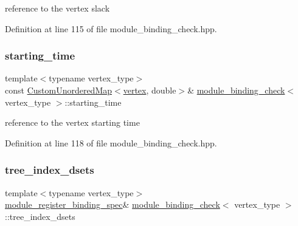 reference to the vertex slack 



Definition at line 115 of file module\+\_\+binding\+\_\+check.\+hpp.

\mbox{\label{structmodule__binding__check_a1d5792322e2f29615ff44bd2989812bc}} 
\subsubsection{\texorpdfstring{starting\+\_\+time}{starting\_time}}
{\footnotesize\ttfamily template$<$typename vertex\+\_\+type$>$ \\
const \hyperlink{custom__map_8hpp_ad1ed68f2ff093683ab1a33522b144adc}{Custom\+Unordered\+Map}$<$\hyperlink{graph_8hpp_abefdcf0544e601805af44eca032cca14}{vertex}, double$>$\& \hyperlink{structmodule__binding__check}{module\+\_\+binding\+\_\+check}$<$ vertex\+\_\+type $>$\+::starting\+\_\+time\hspace{0.3cm}{\ttfamily [private]}}



reference to the vertex starting time 



Definition at line 118 of file module\+\_\+binding\+\_\+check.\+hpp.

\mbox{\label{structmodule__binding__check_ab73a32a396fa5af926ec38aae1252d22}} 
\subsubsection{\texorpdfstring{tree\+\_\+index\+\_\+dsets}{tree\_index\_dsets}}
{\footnotesize\ttfamily template$<$typename vertex\+\_\+type$>$ \\
\hyperlink{classmodule__register__binding__spec}{module\+\_\+register\+\_\+binding\+\_\+spec}\& \hyperlink{structmodule__binding__check}{module\+\_\+binding\+\_\+check}$<$ vertex\+\_\+type $>$\+::tree\+\_\+index\+\_\+dsets\hspace{0.3cm}{\ttfamily [private]}}



